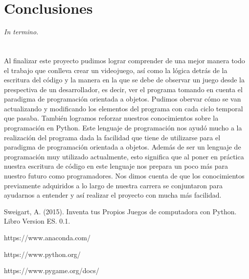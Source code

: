 \documentclass[12pt,letterpaper]{report}
\begin{document}
\chapter{Conclusiones}
\textit{In termino.} \\ \\ \\ 
Al finalizar este proyecto pudimos lograr comprender de una mejor manera todo el trabajo que conlleva crear un videojuego, así como la lógica detrás de la escritura del código y la manera en la que se debe de observar un juego desde la prespectiva de un desarrollador, es decir, ver el programa tomando en cuenta el paradigma de programación orientada a objetos. \newline\newline
Pudimos obervar cómo se van actualizando y modificando los elementos del programa con cada ciclo temporal que pasaba. \newline \newline
También logramos reforzar nuestros conocimientos sobre la programación en Python. Este lenguaje de programación nos ayudó mucho a la realización del programa dada la facilidad que tiene de utilizarse para el paradigma de programación orientada a objetos. Además de ser un lenguaje de programación muy utilizado actualmente, esto significa que al poner en práctica nuestra escritura de código en este lenguaje nos prepara un poco más para nuestro futuro como programadores. \newline\newline
Nos dimos cuenta de que los conocimientos previamente adquiridos a lo largo de nuestra carrera se conjuntaron para ayudarnos a entender y así realizar el proyecto con mucha más facilidad.

\begin{thebibliography}{0}

   Sweigart, A. (2015). Inventa tus Propios Juegos de computadora con Python. Libro Version ES. 0.1.
    
   https://www.anaconda.com/
  
   https://www.python.org/
  
   https://www.pygame.org/docs/  
  
  
\end{thebibliography}
\end{document}
